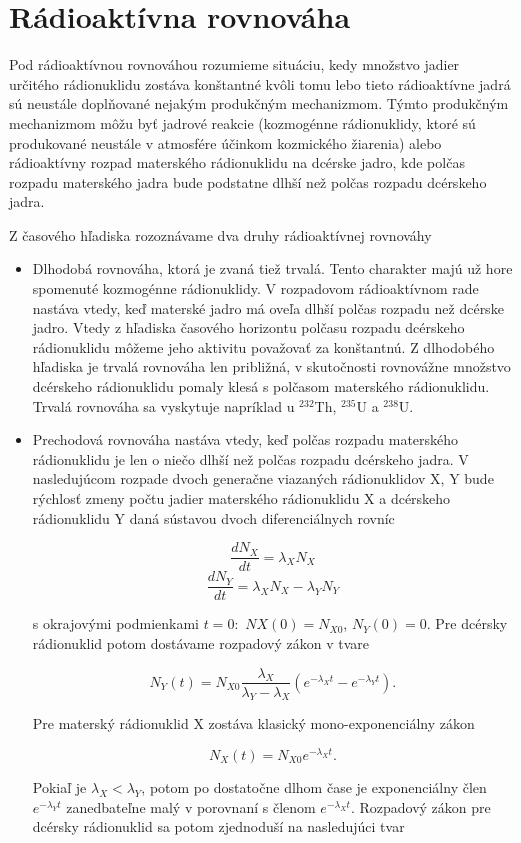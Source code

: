 \documentclass[../../main.tex]{subfiles}
\begin{document}
\section{Rádioaktívna rovnováha}
Pod rádioaktívnou rovnováhou rozumieme situáciu, kedy množstvo jadier určitého rádionuklidu zostáva konštantné kvôli tomu lebo tieto rádioaktívne jadrá sú neustále doplňované nejakým produkčným mechanizmom. Týmto produkčným mechanizmom môžu byť jadrové reakcie (kozmogénne rádionuklidy, ktoré sú produkované neustále v atmosfére účinkom kozmického žiarenia) alebo rádioaktívny rozpad materského rádionuklidu na dcérske jadro, kde polčas rozpadu materského jadra bude podstatne dlhší než polčas rozpadu dcérskeho jadra.

Z časového hľadiska rozoznávame dva druhy rádioaktívnej rovnováhy
\begin{itemize}
\item Dlhodobá rovnováha, ktorá je zvaná tiež trvalá. Tento charakter majú už hore spomenuté kozmogénne rádionuklidy. V rozpadovom rádioaktívnom rade nastáva vtedy, keď materské jadro má oveľa dlhší polčas rozpadu než dcérske jadro. Vtedy z hľadiska časového horizontu polčasu rozpadu dcérskeho rádionuklidu môžeme jeho aktivitu považovať za konštantnú. Z dlhodobého hľadiska je trvalá rovnováha len približná, v skutočnosti rovnovážne množstvo dcérskeho rádionuklidu pomaly klesá s polčasom materského rádionuklidu. Trvalá rovnováha sa vyskytuje napríklad u $^{232}$Th, $^{235}$U a $^{238}$U.
\item Prechodová rovnováha nastáva vtedy, keď polčas rozpadu materského rádionuklidu je len o niečo dlhší než polčas rozpadu dcérskeho jadra. V nasledujúcom rozpade dvoch generačne viazaných rádionuklidov X, Y bude rýchlosť zmeny počtu jadier materského rádionuklidu X a dcérskeho rádionuklidu Y daná sústavou dvoch diferenciálnych rovníc

$$ \frac{dN_X}{dt} = \lambda_XN_X $$
$$ \frac{dN_Y}{dt} = \lambda_XN_X - \lambda_YN_Y $$

s okrajovými podmienkami $t=0:$ $NX(0)=N_{X0}$, $N_Y(0)=0$. Pre dcérsky rádionuklid potom dostávame rozpadový zákon v tvare

$$ N_Y(t) = N_{X0}\frac{\lambda_X}{\lambda_Y - \lambda_X} (e^{-\lambda_Xt}-e^{-\lambda_Yt}).$$

Pre materský rádionuklid X zostáva klasický mono-exponenciálny zákon

$$ N_X(t) = N_{X0}e^{-\lambda_Xt}.$$

Pokiaľ je $\lambda_X<\lambda_Y$, potom po dostatočne dlhom čase je exponenciálny člen $e^{-\lambda_Yt}$ zanedbateľne malý v porovnaní s členom $e^{-\lambda_Xt}$. Rozpadový zákon pre dcérsky rádionuklid sa potom zjednoduší na nasledujúci tvar


\end{itemize}
\end{document}
